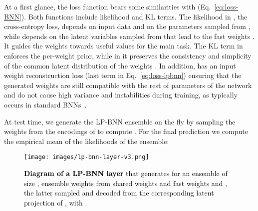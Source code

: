 \documentclass[10pt,twocolumn,letterpaper]{article}
\newcommand{\ab}[1]{\textcolor{black}{#1}}
\newcommand{\method}{LP-BNN\xspace}
\begin{document}
At a first glance, the loss function  bears some similarities with  (Eq.~\ref{eq:loss-BNN}). Both functions include likelihood and KL terms. The likelihood in , \ie the cross-entropy loss, depends on input data  and on the parameters  sampled from , while  {depends} on the latent variables  sampled from  that lead to the fast weights . It guides the weights towards useful values for the main task. The KL term in  enforces the per-weight prior, while in  it preserves the consistency and simplicity of the common latent distribution of the weights . In addition,  has an input weight reconstruction loss (last term in Eq.~\ref{eq:loss-lpbnn}) ensuring that the generated weights  are still compatible with the rest of parameters of the network and do not cause high variance and instabilities during training, as typically occurs in standard BNNs~\cite{dusenberry2020efficient}.


At test time, we generate the LP-BNN ensemble on the fly by sampling the weights  from the encodings of  to compute . For the final prediction we compute the empirical mean of the likelihoods of the ensemble:





\begin{figure}[!t]
\renewcommand{\captionfont}{\small}
\centering
 \texttt{[image: images/lp-bnn-layer-v3.png]}
\caption{\ab{\textbf{Diagram of a \method layer} that generates for an ensemble of size , ensemble weights  from shared weights  and fast weights  and , the latter sampled and decoded from the corresponding latent projection  of , with .}} 
         
\label{fig:LPBNN}
\end{figure}
\end{document}
